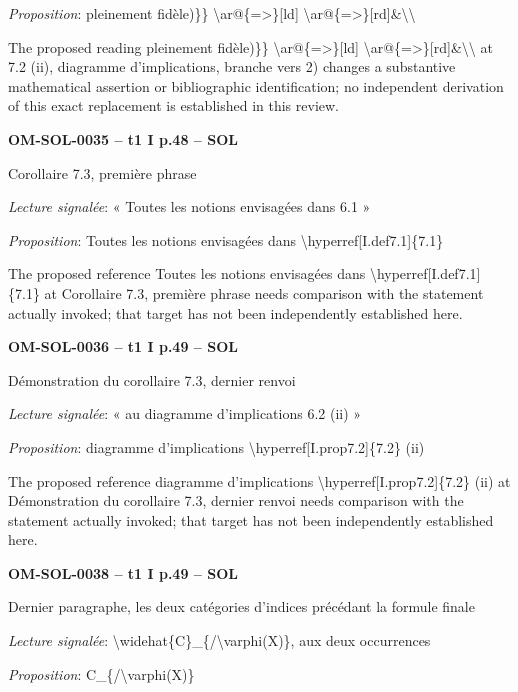 \emph{Proposition}: pleinement fidèle)\}\} \textbackslash{}ar@\{=\allowbreak >\}[ld] \textbackslash{}ar@\{=\allowbreak >\}[rd]\&\textbackslash{}\textbackslash{}\par
The proposed reading pleinement fidèle)\}\} \textbackslash{}ar@\{=\allowbreak >\}[ld] \textbackslash{}ar@\{=\allowbreak >\}[rd]\&\textbackslash{}\textbackslash{} at 7.2 (ii), diagramme d'implications, branche vers 2) changes a substantive mathematical assertion or bibliographic identification; no independent derivation of this exact replacement is established in this review.\par
\par\noindent\textbf{OM-SOL-0035 -- t1 I p.48 -- SOL}\par
Corollaire 7.3, première phrase\par
\emph{Lecture signalée}: « Toutes les notions envisagées dans 6.1 »\par
\emph{Proposition}: Toutes les notions envisagées dans \textbackslash{}hyperref[I.def7.1]\{7.1\}\par
The proposed reference Toutes les notions envisagées dans \textbackslash{}hyperref[I.def7.1]\{7.1\} at Corollaire 7.3, première phrase needs comparison with the statement actually invoked; that target has not been independently established here.\par
\par\noindent\textbf{OM-SOL-0036 -- t1 I p.49 -- SOL}\par
Démonstration du corollaire 7.3, dernier renvoi\par
\emph{Lecture signalée}: « au diagramme d'implications 6.2 (ii) »\par
\emph{Proposition}: diagramme d'implications \textbackslash{}hyperref[I.prop7.2]\{7.2\} (ii)\par
The proposed reference diagramme d'implications \textbackslash{}hyperref[I.prop7.2]\{7.2\} (ii) at Démonstration du corollaire 7.3, dernier renvoi needs comparison with the statement actually invoked; that target has not been independently established here.\par
\par\noindent\textbf{OM-SOL-0038 -- t1 I p.49 -- SOL}\par
Dernier paragraphe, les deux catégories d'indices précédant la formule finale\par
\emph{Lecture signalée}: \textbackslash{}widehat\{C\}\_\{/\textbackslash{}varphi(X)\}, aux deux occurrences\par
\emph{Proposition}: C\_\{/\textbackslash{}varphi(X)\}\par
